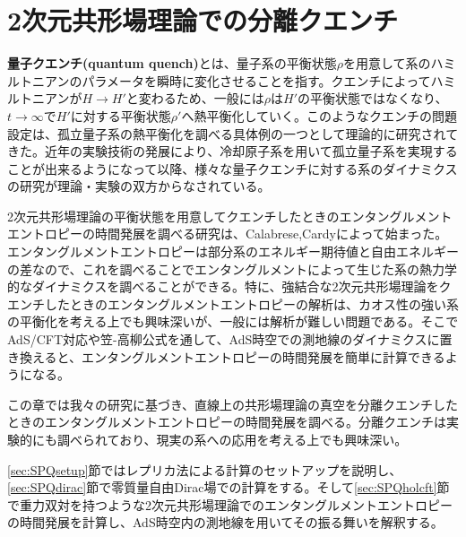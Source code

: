 \chapter{2次元共形場理論での分離クエンチ}\label{chap:singlquench}
\textbf{量子クエンチ(quantum quench)}とは、量子系の平衡状態$\rho$を用意して系のハミルトニアンのパラメータを瞬時に変化させることを指す。クエンチによってハミルトニアンが$H\to H'$と変わるため、一般には$\rho$は$H'$の平衡状態ではなくなり、$t\to \infty$で$H'$に対する平衡状態$\rho'$へ熱平衡化していく。このようなクエンチの問題設定は、孤立量子系の熱平衡化を調べる具体例の一つとして理論的に研究されてきた。近年の実験技術の発展により、冷却原子系を用いて孤立量子系を実現することが出来るようになって以降、様々な量子クエンチに対する系のダイナミクスの研究が理論・実験の双方からなされている。

2次元共形場理論の平衡状態を用意してクエンチしたときのエンタングルメントエントロピーの時間発展を調べる研究は、Calabrese,Cardy\cite{Calabrese2006}によって始まった。エンタングルメントエントロピーは部分系のエネルギー期待値と自由エネルギーの差なので、これを調べることでエンタングルメントによって生じた系の熱力学的なダイナミクスを調べることができる。特に、強結合な2次元共形場理論をクエンチしたときのエンタングルメントエントロピーの解析は、カオス性の強い系の平衡化を考える上でも興味深いが、一般には解析が難しい問題である。そこでAdS/CFT対応や笠-高柳公式を通して、AdS時空での測地線のダイナミクスに置き換えると、エンタングルメントエントロピーの時間発展を簡単に計算できるようになる。

この章では我々の研究\cite{Shimaji:2018czt}に基づき、直線上の共形場理論の真空を分離クエンチしたときのエンタングルメントエントロピーの時間発展を調べる。分離クエンチは実験的にも調べられており\cite{gring2012relaxation}、現実の系への応用を考える上でも興味深い。

\ref{sec:SPQsetup}節ではレプリカ法による計算のセットアップを説明し、\ref{sec:SPQdirac}節で零質量自由Dirac場での計算をする。そして\ref{sec:SPQholcft}節で重力双対を持つような2次元共形場理論でのエンタングルメントエントロピーの時間発展を計算し、AdS時空内の測地線を用いてその振る舞いを解釈する。

